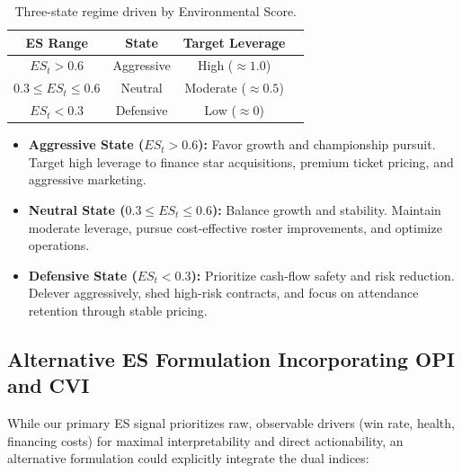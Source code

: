 \documentclass{mcmthesis}
\begin{document}
\begin{table}[htbp]
\centering
\begin{tabular}{|c|c|c|c|}
\hline
\textbf{ES Range} & \textbf{State}      & \textbf{Target Leverage}\\ %
\hline
$ES_t > 0.6$      & Aggressive         & High ($\approx 1.0$)  \\  %
\hline
$0.3 \leq ES_t \leq 0.6$ & Neutral     & Moderate ($\approx 0.5$)\\%
\hline
$ES_t < 0.3$      & Defensive          & Low ($\approx 0$)       \\%
\hline
\end{tabular}
\caption{Three-state regime driven by Environmental Score.}
\label{tab:states}
\end{table}
\begin{itemize}
    \item \textbf{Aggressive State ($ES_t > 0.6$):} Favor growth and championship pursuit. Target high leverage to finance star acquisitions, premium ticket pricing, and aggressive marketing.
    \item \textbf{Neutral State ($0.3 \leq ES_t \leq 0.6$):} Balance growth and stability. Maintain moderate leverage, pursue cost-effective roster improvements, and optimize operations.
    \item \textbf{Defensive State ($ES_t < 0.3$):} Prioritize cash-flow safety and risk reduction. Delever aggressively, shed high-risk contracts, and focus on attendance retention through stable pricing.
\end{itemize}

\subsection{Alternative ES Formulation Incorporating OPI and CVI}
While our primary ES signal prioritizes raw, observable drivers (win rate, health, financing costs) for maximal interpretability and direct actionability, an alternative formulation could explicitly integrate the dual indices:
\end{document}
